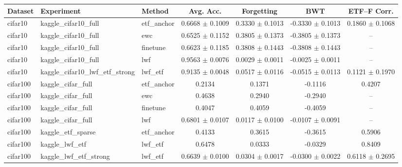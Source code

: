 \begin{tabular}{lllcccc}
\hline
Dataset & Experiment & Method & Avg. Acc. & Forgetting & BWT & ETF--F Corr. \\
\hline
cifar10 & kaggle_cifar10_full & etf_anchor & 0.6668 $\pm$ 0.1009 & 0.3330 $\pm$ 0.1013 & -0.3330 $\pm$ 0.1013 & 0.1860 $\pm$ 0.1068 \\
cifar10 & kaggle_cifar10_full & ewc & 0.6525 $\pm$ 0.1152 & 0.3805 $\pm$ 0.1373 & -0.3805 $\pm$ 0.1373 & -- \\
cifar10 & kaggle_cifar10_full & finetune & 0.6623 $\pm$ 0.1185 & 0.3808 $\pm$ 0.1443 & -0.3808 $\pm$ 0.1443 & -- \\
cifar10 & kaggle_cifar10_full & lwf & 0.9563 $\pm$ 0.0076 & 0.0029 $\pm$ 0.0011 & -0.0025 $\pm$ 0.0011 & -- \\
cifar10 & kaggle_cifar10_lwf_etf_strong & lwf_etf & 0.9135 $\pm$ 0.0048 & 0.0517 $\pm$ 0.0116 & -0.0515 $\pm$ 0.0113 & 0.1121 $\pm$ 0.1970 \\
cifar100 & kaggle_cifar_full & etf_anchor & 0.2134 & 0.1371 & -0.1116 & 0.4207 \\
cifar100 & kaggle_cifar_full & ewc & 0.4638 & 0.2940 & -0.2940 & -- \\
cifar100 & kaggle_cifar_full & finetune & 0.4047 & 0.4059 & -0.4059 & -- \\
cifar100 & kaggle_cifar_full & lwf & 0.6801 $\pm$ 0.0107 & 0.0117 $\pm$ 0.0100 & -0.0107 $\pm$ 0.0091 & -- \\
cifar100 & kaggle_etf_sparse & etf_anchor & 0.4133 & 0.3615 & -0.3615 & 0.5906 \\
cifar100 & kaggle_lwf_etf & lwf_etf & 0.6478 & 0.0333 & -0.0329 & 0.8409 \\
cifar100 & kaggle_lwf_etf_strong & lwf_etf & 0.6639 $\pm$ 0.0100 & 0.0304 $\pm$ 0.0017 & -0.0300 $\pm$ 0.0022 & 0.6118 $\pm$ 0.2695 \\
\hline
\end{tabular}
